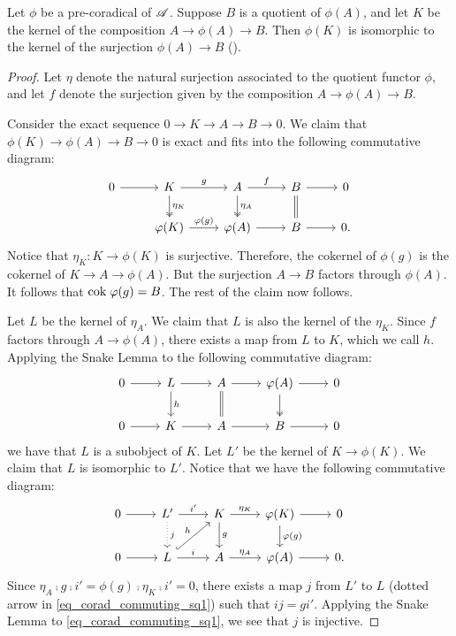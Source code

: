 \begin{prop}
Let $\phi$ be a pre-coradical of $\mathscr{A}$. Suppose $B$ is a 
quotient of $\phi(A)$, and let $K$ be the kernel of the 
composition $A \to \phi(A) \to B$. Then $\phi(K)$ is isomorphic 
to the kernel of the surjection $\phi(A) \to B$ (\CF \cite[I2.3]{BJV}).
\end{prop}
\begin{proof}
Let $\eta$ denote the natural surjection associated to the 
quotient functor $\phi$, and let $f$ denote the surjection given 
by the composition $A \to \phi(A) \to B$.

Consider the exact sequence $0 \to K \to A \to B \to 0$. We claim
that $\phi(K) \to \phi(A) \to B \to 0$ is exact and fits into the 
following commutative diagram:
\[
\begin{tikzcd}
0 \arrow{r} &
K \arrow{r}{g} \arrow[twoheadrightarrow]{d}{\eta_K} &
A \arrow{r}{f} \arrow[twoheadrightarrow]{d}{\eta_A} &
B \arrow{r} \arrow[equal]{d} &
0 \\
& \phi(K) \arrow{r}{\phi(g)} &
\phi(A) \arrow{r} &
B \arrow{r} &
0.
\end{tikzcd}
\]
Notice that $\eta_K: K \to \phi(K)$ is surjective. Therefore, the
cokernel of $\phi(g)$ is the cokernel of $K \to A \to \phi(A)$.
But the surjection $A \to B$ factors through $\phi(A)$. It 
follows that $\mathrm{cok}\; \varphi(g) = B$. The rest of the claim now 
follows.

Let $L$ be the kernel of $\eta_A$. We claim that $L$ is also the 
kernel of the $\eta_K$. Since $f$ factors through $A \to \phi(A)$,
there exists a map from $L$ to $K$, which we call $h$. Applying 
the Snake Lemma to the following commutative diagram:
\[
\begin{tikzcd}
0 \arrow{r} &
L \arrow{r} \arrow{d}{h} &
A \arrow{r} \arrow[equals]{d} &
\phi(A) \arrow{r}\arrow[twoheadrightarrow]{d} &
0 \\
0 \arrow{r} &
K \arrow{r} &
A \arrow{r} &
B \arrow{r} &
0
\end{tikzcd}
\]
we have that $L$ is a subobject of $K$. Let $L'$ be the kernel of
$K \to \phi(K)$. We claim that $L$ is isomorphic to $L'$. Notice
that we have the following commutative diagram:
\begin{equation}\label{eq_corad_commuting_sq1}
\begin{tikzcd}
0 \arrow{r} &
L' \arrow{r}{i'} \arrow[dotted]{d}{j} &
K \arrow{r}{\eta_K} \arrow{d}{g} &
\phi(K) \arrow{r}\arrow{d}{\phi(g)} &
0 \\
0 \arrow{r} &
L \arrow{r}{i}\arrow[hookrightarrow]{ru}{h} &
A \arrow{r}{\eta_A} &
\phi(A) \arrow{r} &
0.
\end{tikzcd}
\end{equation}
Since $\eta_A \comp g \comp i' = \phi(g) \comp \eta_K \comp i' = 
0$, there exists a map $j$ from $L'$ to $L$ (dotted arrow in 
\eqref{eq_corad_commuting_sq1}) such that $ij = gi'$. Applying the 
Snake Lemma to \eqref{eq_corad_commuting_sq1}, we see that $j$ is 
injective.


\end{proof}
